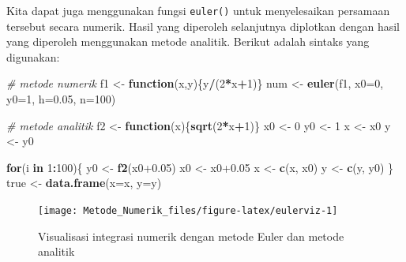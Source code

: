 \documentclass[
]{book}
\newenvironment{Shaded}{\begin{snugshade}}{\end{snugshade}}
\newcommand{\AttributeTok}[1]{\textcolor[rgb]{0.13,0.29,0.53}{#1}}
\newcommand{\CommentTok}[1]{\textcolor[rgb]{0.56,0.35,0.01}{\textit{#1}}}
\newcommand{\ControlFlowTok}[1]{\textcolor[rgb]{0.13,0.29,0.53}{\textbf{#1}}}
\newcommand{\DecValTok}[1]{\textcolor[rgb]{0.00,0.00,0.81}{#1}}
\newcommand{\FloatTok}[1]{\textcolor[rgb]{0.00,0.00,0.81}{#1}}
\newcommand{\FunctionTok}[1]{\textcolor[rgb]{0.13,0.29,0.53}{\textbf{#1}}}
\newcommand{\NormalTok}[1]{#1}
\newcommand{\OtherTok}[1]{\textcolor[rgb]{0.56,0.35,0.01}{#1}}
\newcommand{\SpecialCharTok}[1]{\textcolor[rgb]{0.81,0.36,0.00}{\textbf{#1}}}
\theoremstyle{definition}
\theoremstyle{definition}
\theoremstyle{definition}
\theoremstyle{definition}
\theoremstyle{remark}
\begin{document}
Kita dapat juga menggunakan fungsi \texttt{euler()} untuk menyelesaikan persamaan tersebut secara numerik. Hasil yang diperoleh selanjutnya diplotkan dengan hasil yang diperoleh menggunakan metode analitik. Berikut adalah sintaks yang digunakan:

\begin{Shaded}
\begin{Highlighting}[]
\CommentTok{\# metode numerik}
\NormalTok{f1 }\OtherTok{\textless{}{-}} \ControlFlowTok{function}\NormalTok{(x,y)\{y}\SpecialCharTok{/}\NormalTok{(}\DecValTok{2}\SpecialCharTok{*}\NormalTok{x}\SpecialCharTok{+}\DecValTok{1}\NormalTok{)\}}
\NormalTok{num }\OtherTok{\textless{}{-}} \FunctionTok{euler}\NormalTok{(f1, }\AttributeTok{x0=}\DecValTok{0}\NormalTok{, }\AttributeTok{y0=}\DecValTok{1}\NormalTok{, }\AttributeTok{h=}\FloatTok{0.05}\NormalTok{, }\AttributeTok{n=}\DecValTok{100}\NormalTok{)}

\CommentTok{\# metode analitik}
\NormalTok{f2 }\OtherTok{\textless{}{-}} \ControlFlowTok{function}\NormalTok{(x)\{}\FunctionTok{sqrt}\NormalTok{(}\DecValTok{2}\SpecialCharTok{*}\NormalTok{x}\SpecialCharTok{+}\DecValTok{1}\NormalTok{)\}}
\NormalTok{x0 }\OtherTok{\textless{}{-}} \DecValTok{0}
\NormalTok{y0 }\OtherTok{\textless{}{-}} \DecValTok{1}
\NormalTok{x }\OtherTok{\textless{}{-}}\NormalTok{ x0}
\NormalTok{y }\OtherTok{\textless{}{-}}\NormalTok{ y0}

\ControlFlowTok{for}\NormalTok{(i }\ControlFlowTok{in} \DecValTok{1}\SpecialCharTok{:}\DecValTok{100}\NormalTok{)\{}
\NormalTok{  y0 }\OtherTok{\textless{}{-}} \FunctionTok{f2}\NormalTok{(x0}\FloatTok{+0.05}\NormalTok{)}
\NormalTok{  x0 }\OtherTok{\textless{}{-}}\NormalTok{ x0}\FloatTok{+0.05}
\NormalTok{  x }\OtherTok{\textless{}{-}} \FunctionTok{c}\NormalTok{(x, x0)}
\NormalTok{  y }\OtherTok{\textless{}{-}} \FunctionTok{c}\NormalTok{(y, y0)}
\NormalTok{\}}
\NormalTok{true }\OtherTok{\textless{}{-}} \FunctionTok{data.frame}\NormalTok{(}\AttributeTok{x=}\NormalTok{x, }\AttributeTok{y=}\NormalTok{y)}
\end{Highlighting}
\end{Shaded}

\begin{figure}

{\centering \texttt{[image: Metode\_Numerik\_files/figure-latex/eulerviz-1]} 

}

\caption{Visualisasi integrasi numerik dengan metode Euler dan metode analitik}\label{fig:eulerviz}
\end{figure}
\end{document}
